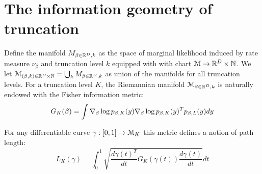 \documentclass[letterpaper]{article}
\begin{document}
\section{The information geometry of truncation}

Define the manifold $M_{\beta\in\mathbb{R}^D,k}$ as the space of  marginal likelihood induced by rate measure $\nu_\beta$ and truncation level $k$ equipped with with chart $\mathcal{M}\rightarrow\mathbb{R}^D\times\mathbb{N}$. We let $\mathcal{M}_{(\beta,k)\in\mathbb{R}^D\times\mathbb{N}}=\bigcup_k M_{\beta\in\mathbb{R}^D,k}$ as union of the manifolds for all truncation levels. For a truncation level $K$, the Riemannian manifold $\mathcal{M}_{\beta\in\mathbb{R}^D,k}$ is naturally endowed with the Fisher information metric:
\[
	G_K(\beta)=\int\nabla_\beta\log p_{\beta,K}(y)\nabla_\beta\log p_{\beta,K}(y)^Tp_{\beta,L}(y)dy
\]

For any differentiable curve $\gamma:[0,1]\rightarrow\mathcal{M}_K$ this metric defines a notion of path length:
\[
	L_K(\gamma)=\int_0^1\sqrt{\frac{d\gamma(t)^T}{dt}G_K(\gamma(t))\frac{d\gamma(t)}{dt}}dt
\]



{
\small


}
\end{document}
